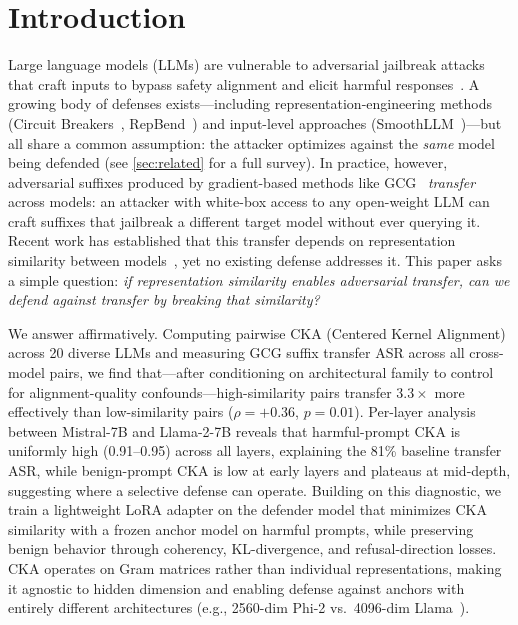 \section{Introduction}

Large language models (LLMs) are vulnerable to adversarial jailbreak attacks that craft inputs to bypass safety alignment and elicit harmful responses~\citep{wei2024jailbroken}.
A growing body of defenses exists---including representation-engineering methods (Circuit Breakers~\citep{zou2024circuitbreakers}, RepBend~\citep{repbend}) and input-level approaches (SmoothLLM~\citep{smoothllm})---but all share a common assumption: the attacker optimizes against the \emph{same} model being defended (see \cref{sec:related} for a full survey).
In practice, however, adversarial suffixes produced by gradient-based methods like GCG~\citep{zou2023universal} \emph{transfer} across models: an attacker with white-box access to any open-weight LLM can craft suffixes that jailbreak a different target model without ever querying it.
Recent work has established that this transfer depends on representation similarity between models~\citep{angell2025transfer, li2025causes}, yet no existing defense addresses it.
This paper asks a simple question: \emph{if representation similarity enables adversarial transfer, can we defend against transfer by breaking that similarity?}

We answer affirmatively.
Computing pairwise CKA (Centered Kernel Alignment) across 20 diverse LLMs and measuring GCG suffix transfer ASR across all cross-model pairs, we find that---after conditioning on architectural family to control for alignment-quality confounds---high-similarity pairs transfer $3.3\times$ more effectively than low-similarity pairs ($\rho = +0.36$, $p = 0.01$).
Per-layer analysis between Mistral-7B and Llama-2-7B reveals that harmful-prompt CKA is uniformly high (0.91--0.95) across all layers, explaining the 81\% baseline transfer ASR, while benign-prompt CKA is low at early layers and plateaus at mid-depth, suggesting where a selective defense can operate.
Building on this diagnostic, we train a lightweight LoRA adapter on the defender model that minimizes CKA similarity with a frozen anchor model on harmful prompts, while preserving benign behavior through coherency, KL-divergence, and refusal-direction losses.
CKA operates on Gram matrices rather than individual representations, making it agnostic to hidden dimension and enabling defense against anchors with entirely different architectures (e.g., 2560-dim Phi-2 vs.\ 4096-dim Llama~\citep{llama2}).

